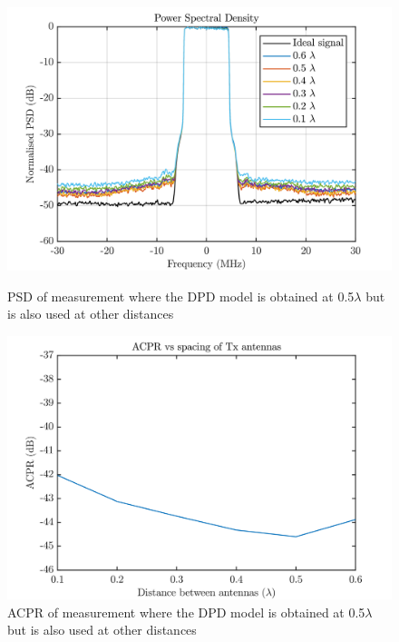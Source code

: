\begin{figure}[H]
  \centering
  \begin{minipage}[b]{0.5\textwidth}
	\includegraphics[scale = 0.5]{figures/measurement/cree/meas4/PSD_dif.png}
	\caption{PSD of measurement where the DPD model is obtained at 0.5$\lambda$ but is also used at other distances}	
    \label{fig:meas4_amam5_4}
  \end{minipage}
  \hfill
  \begin{minipage}[b]{0.4\textwidth}
	\includegraphics[scale = 0.5]{figures/measurement/cree/meas4/ACPR_dif.png}
	\caption{ACPR of measurement where the DPD model is obtained at 0.5$\lambda$ but is also used at other distances}
    \label{fig:meas4_amam6_4}
  \end{minipage}
\end{figure}



